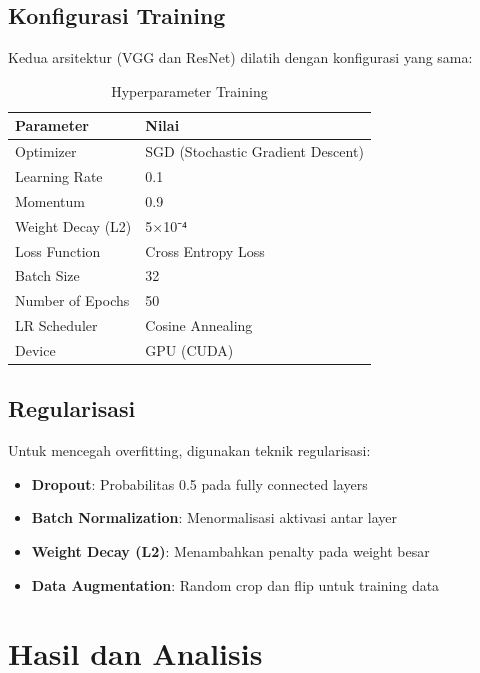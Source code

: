 \documentclass[12pt,a4paper]{report}
\begin{document}
\section{Konfigurasi Training}

Kedua arsitektur (VGG dan ResNet) dilatih dengan konfigurasi yang sama:

\begin{table}[H]
\centering
\caption{Hyperparameter Training}
\begin{tabular}{|l|l|}
\hline
\textbf{Parameter} & \textbf{Nilai} \\
\hline
Optimizer & SGD (Stochastic Gradient Descent) \\
\hline
Learning Rate & 0.1 \\
\hline
Momentum & 0.9 \\
\hline
Weight Decay (L2) & 5×10⁻⁴ \\
\hline
Loss Function & Cross Entropy Loss \\
\hline
Batch Size & 32 \\
\hline
Number of Epochs & 50 \\
\hline
LR Scheduler & Cosine Annealing \\
\hline
Device & GPU (CUDA) \\
\hline
\end{tabular}
\end{table}

\section{Regularisasi}

Untuk mencegah overfitting, digunakan teknik regularisasi:

\begin{itemize}
    \item \textbf{Dropout}: Probabilitas 0.5 pada fully connected layers
    \item \textbf{Batch Normalization}: Menormalisasi aktivasi antar layer
    \item \textbf{Weight Decay (L2)}: Menambahkan penalty pada weight besar
    \item \textbf{Data Augmentation}: Random crop dan flip untuk training data
\end{itemize}

\chapter{Hasil dan Analisis}
\end{document}
